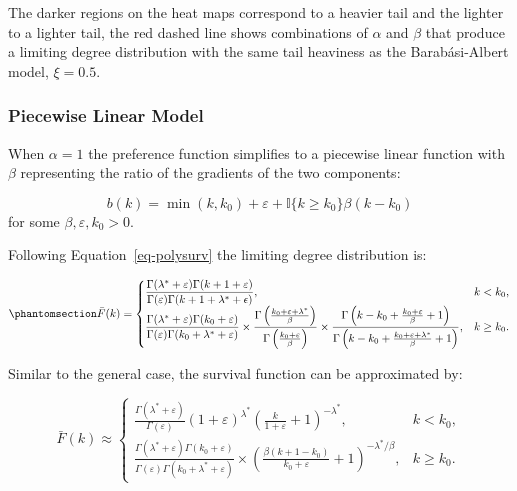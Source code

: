 \documentclass[
  sn-basic,
]{sn-jnl}
\theoremstyle{plain}
\theoremstyle{remark}
\begin{document}
The darker regions on the heat maps correspond to a heavier tail and the
lighter to a lighter tail, the red dashed line shows combinations of
\(\alpha\) and \(\beta\) that produce a limiting degree distribution
with the same tail heaviness as the Barabási-Albert model, \(\xi=0.5\).

\subsubsection{Piecewise Linear Model}\label{piecewise-linear-model}

When \(\alpha = 1\) the preference function simplifies to a piecewise
linear function with \(\beta\) representing the ratio of the gradients
of the two components:

\[
b(k) = \min(k,k_0) + \varepsilon + \mathbb I\{k\ge k_0\}\beta(k-k_0)
\] for some \(\beta, \varepsilon, k_0>0\).

Following Equation~\ref{eq-polysurv} the limiting degree distribution
is:

\begin{equation}\phantomsection\label{eq-linsurv}{
\bar F(k) = \begin{cases}
\displaystyle\frac{\Gamma(\lambda^*+\varepsilon)\Gamma(k+1+\varepsilon)}{\Gamma(\varepsilon)\Gamma(k+1+\lambda^*+\epsilon)},&k<k_0,\\
\displaystyle\frac{\Gamma(\lambda^*+\varepsilon)\Gamma(k_0+\varepsilon)}{\Gamma(\varepsilon)\Gamma(k_0+\lambda^*+\varepsilon)}\times \frac{\Gamma\left(\frac{k_0+\varepsilon+\lambda^*}{\beta}\right)}{\Gamma\left(\frac{k_0+\varepsilon}{\beta}\right)}\times\frac{\Gamma\left(k-k_0 + \frac{k_0+\varepsilon}{\beta}+1\right)}{\Gamma\left(k-k_0 + \frac{k_0+\varepsilon+\lambda^*}{\beta}+1\right)},&k\ge k_0.
\end{cases}
}\end{equation}

Similar to the general case, the survival function can be approximated
by:

\[
\bar F(k) \approx \begin{cases}
\displaystyle\frac{\Gamma(\lambda^*+\varepsilon)}{\Gamma(\varepsilon)} (1+\varepsilon)^{\lambda^*}\left(\frac{k}{1+\varepsilon} + 1\right)^{-\lambda^*},&k<k_0,\\
\displaystyle\frac{\Gamma(\lambda^*+\varepsilon)\Gamma(k_0+\varepsilon)}{\Gamma(\varepsilon)\Gamma(k_0+\lambda^*+\varepsilon)}\times\left(\frac{\beta(k+1-k_0)}{k_0+\varepsilon} + 1\right)^{-\lambda^*/\beta},&k\ge k_0.
\end{cases}
\]
\end{document}
